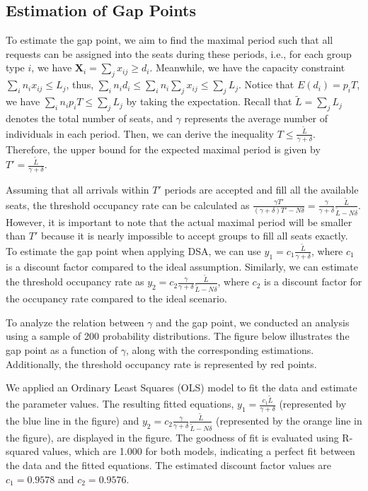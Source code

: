 \subsection{Estimation of Gap Points}
To estimate the gap point, we aim to find the maximal period such that all requests can be assigned into the seats during these periods, i.e., for each group type $i$, we have $\bm{X}_{i} = \sum_{j} x_{ij} \geq d_i$. Meanwhile, we have the capacity constraint $\sum_{i} n_{i} x_{ij} \leq L_j$, thus, $\sum_{i} n_i d_i \leq \sum_{i} n_i \sum_{j} x_{ij} \leq \sum_{j} L_{j}$. Notice that $E(d_i) = p_i T$, we have $\sum_{i} n_i p_i T \leq \sum_{j} L_{j}$ by taking the expectation. Recall that $\tilde{L} = \sum_{j} L_{j}$ denotes the total number of seats, and $\gamma$ represents the average number of individuals in each period. Then, we can derive the inequality $T \leq \frac{\tilde{L}}{\gamma + \delta}$. Therefore, the upper bound for the expected maximal period is given by $T' = \frac{\tilde{L}}{\gamma + \delta}$.


Assuming that all arrivals within $T'$ periods are accepted and fill all the available seats, the threshold occupancy rate can be calculated as $\frac{\gamma T'}{(\gamma+ \delta)T' - N \delta} = \frac{\gamma}{\gamma +\delta} \frac{\tilde{L}}{\tilde{L}-N \delta}$. However, it is important to note that the actual maximal period will be smaller than $T{'}$ because it is nearly impossible to accept groups to fill all seats exactly. To estimate the gap point when applying DSA, we can use $y_1 = c_1 \frac{\tilde{L}}{\gamma + \delta}$, where $c_1$ is a discount factor compared to the ideal assumption. Similarly, we can estimate the threshold occupancy rate as $y_2 = c_2 \frac{\gamma}{\gamma +\delta} \frac{\tilde{L}}{\tilde{L}-N \delta}$, where $c_2$ is a discount factor for the occupancy rate compared to the ideal scenario.

To analyze the relation between $\gamma$ and the gap point, we conducted an analysis using a sample of 200 probability distributions. The figure below illustrates the gap point as a function of $\gamma$, along with the corresponding estimations.  Additionally, the threshold occupancy rate is represented by red points. 

We applied an Ordinary Least Squares (OLS) model to fit the data and estimate the parameter values. The resulting fitted equations, $y_1 = \frac{c_1 \tilde{L}}{\gamma + \delta}$ (represented by the blue line in the figure) and $y_2 = c_2 \frac{\gamma}{\gamma + \delta} \frac{\tilde{L}}{\tilde{L}-N \delta}$ (represented by the orange line in the figure), are displayed in the figure. The goodness of fit is evaluated using R-squared values, which are 1.000 for both models, indicating a perfect fit between the data and the fitted equations. The estimated discount factor values are $c_1 = 0.9578$ and $c_2 = 0.9576$.

